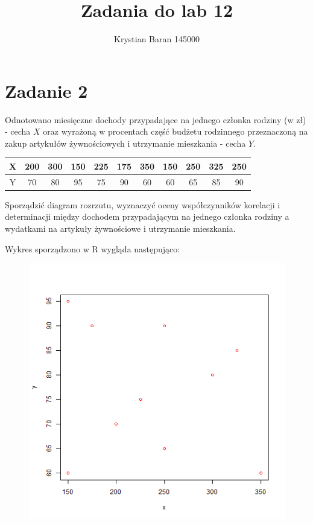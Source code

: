 \documentclass{article}
\author{Krystian Baran 145000}
\title{Zadania do lab 12}
\begin{document}
\maketitle
\newpage

\tableofcontents
\newpage

\section{Zadanie 2}

Odnotowano miesięczne dochody przypadające na jednego członka rodziny (w zł) - cecha $X$ oraz wyrażoną w procentach część budżetu rodzinnego przeznaczoną na zakup artykułów żywnościowych i utrzymanie mieszkania - cecha $Y$.
\begin{center} \begin{tabular}{|c|c|c|c|c|c|c|c|c|c|c|} \hline
X & 200 & 300 & 150 & 225 & 175 & 350 & 150 & 250 & 325 & 250 \\ \hline
Y & 70 & 80 & 95 & 75 & 90 & 60 & 60 & 65 & 85 & 90 \\ \hline
\end{tabular} \end{center}
Sporządzić diagram rozrzutu, wyznaczyć oceny współczynników korelacji i determinacji między dochodem przypadającym na jednego członka rodziny a wydatkami na artykuły żywnościowe i utrzymanie mieszkania. \\ \par

Wykres sporządzono w R wygląda następująco:
\begin{figure}[h!]
\begin{center}
\includegraphics[height = 0.5\textheight, angle = 0]{"w11zad2.png"}
\end{center} \end{figure} 
\end{document}
